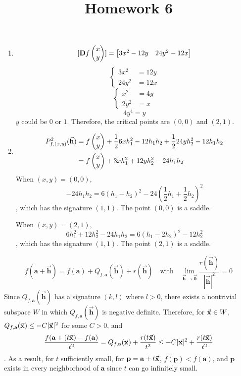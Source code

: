 \documentclass{homework}
\title{Homework 6}
\begin{document}
\maketitle

\begin{problem}{1}
\begin{enumerate}
\item
$$[\mathbf{D}f\begin{pmatrix}x\\y\end{pmatrix}] = \begin{bmatrix}3x^2-12y & 24y^2-12x\end{bmatrix}$$
$$\left\{
\begin{aligned}
3x^2  &= 12y \\
24y^2 &= 12x
\end{aligned}
\right.$$
$$\left\{
\begin{aligned}
x^2  &= 4y \\
2y^2 &= x
\end{aligned}
\right.$$
$$4y^4 = y$$
$y$ could be $0$ or $1$. Therefore, the critical points are $(0, 0)$ and
$(2, 1)$.

\item
\begin{align*}
P_{f, (x,y)}^2 (\vec{\mathbf{h}})
&= f\begin{pmatrix}x\\y\end{pmatrix} + \frac{1}{2}6xh_1^2 - 12h_1h_2
  + \frac{1}{2}24yh_2^2 - 12h_1h_2\\
&= f\begin{pmatrix}x\\y\end{pmatrix} + 3xh_1^2 + 12yh_2^2 - 24h_1h_2\\
\end{align*}
When $(x, y) = (0, 0)$,
$$-24h_1h_2 = 6(h_1 - h_2)^2 - 24(\frac{1}{2}h_1 + \frac{1}{2}h_2)^2$$
, which has the signature $(1, 1)$. The point $(0, 0)$ is a saddle.

When $(x, y) = (2, 1)$,
$$6h_1^2 + 12h_2^2 - 24h_1h_2 = 6(h_1-2h_2)^2 - 12h_2^2$$
, which has the signature $(1, 1)$. The point $(2, 1)$ is a saddle.

\end{enumerate}
\end{problem}

\begin{problem}{2}
$$f(\mathbf{a}+\vec{\mathbf{h}}) = f(\mathbf{a}) +
Q_{f,\mathbf{a}}(\vec{\mathbf{h}}) + r(\vec{\mathbf{h}})
\quad \text{with} \quad \lim_{\vec{\mathbf{h}} \to \vec{\mathbf{0}}}
\frac{r(\vec{\mathbf{h}})}{|\vec{\mathbf{h}}|^2} = 0$$
Since $Q_{f,\mathbf{a}}(\vec{\mathbf{h}})$ has a signature $(k, l)$ where
$l > 0$, there exists a nontrivial subspace $W$ in which
$Q_{f,\mathbf{a}}(\vec{\mathbf{h}})$ is negative definite. Therefore, for
$\vec{\mathbf{x}} \in W$, $Q_{f,\mathbf{a}}(\vec{\mathbf{x}}) \leq -C|\vec{\mathbf{x}}|^2$ for some
$C > 0$, and
$$\frac{f(\mathbf{a} + (t\vec{\mathbf{x}}) - f(\mathbf{a})}{t^2}
= Q_{f,\mathbf{a}}(\vec{\mathbf{x}}) + \frac{r(t\vec{\mathbf{x}})}{t^2}
\leq -C|\vec{\mathbf{x}}|^2 + \frac{r(t\vec{\mathbf{x}})}{t^2}$$
. As a result, for $t$ sufficiently small, for
$\mathbf{p} = \mathbf{a} + t\vec{\mathbf{x}}$, $f(\mathbf{p}) < f(\mathbf{a})$, and
$\mathbf{p}$ exists in every neighborhood of $\mathbf{a}$ since $t$ can go
infinitely small. \QED
\end{problem}
\end{document}
